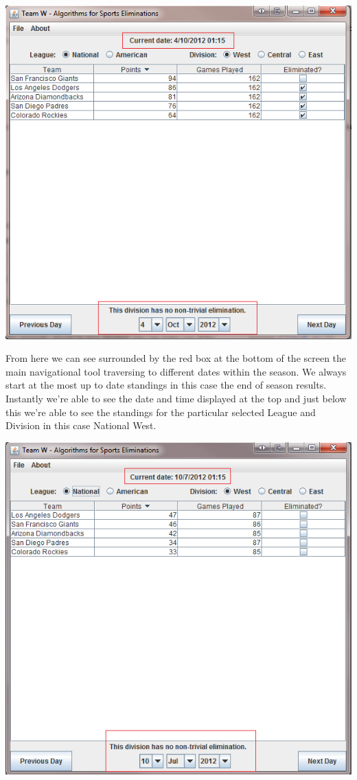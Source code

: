 \includegraphics[width=\linewidth,keepaspectratio]{images/userManualDesk1.png}

From here we can see surrounded by the red box at the bottom of the screen the main navigational tool traversing to different dates within the season. We always start at the most up to date standings in this case the end of season results. Instantly we're able to see the date and time displayed at the top and just below this we're able to see the standings for the particular selected League and Division in this case National West.

\includegraphics[width=\linewidth,keepaspectratio]{images/userManualDesk2.png}

